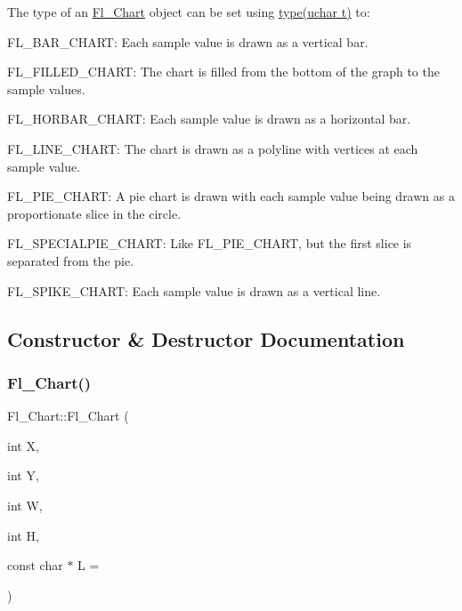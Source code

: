 The type of an \hyperlink{class_fl___chart}{Fl\+\_\+\+Chart} object can be set using \hyperlink{class_fl___widget_ad00d1457b3f578c8e6ffca52d9facad8}{type(uchar t)} to\+: \begin{DoxyItemize}
\item {\ttfamily F\+L\+\_\+\+B\+A\+R\+\_\+\+C\+H\+A\+RT\+:} Each sample value is drawn as a vertical bar. \item {\ttfamily F\+L\+\_\+\+F\+I\+L\+L\+E\+D\+\_\+\+C\+H\+A\+RT\+:} The chart is filled from the bottom of the graph to the sample values. \item {\ttfamily F\+L\+\_\+\+H\+O\+R\+B\+A\+R\+\_\+\+C\+H\+A\+RT\+:} Each sample value is drawn as a horizontal bar. \item {\ttfamily F\+L\+\_\+\+L\+I\+N\+E\+\_\+\+C\+H\+A\+RT\+:} The chart is drawn as a polyline with vertices at each sample value. \item {\ttfamily F\+L\+\_\+\+P\+I\+E\+\_\+\+C\+H\+A\+RT\+:} A pie chart is drawn with each sample value being drawn as a proportionate slice in the circle. \item {\ttfamily F\+L\+\_\+\+S\+P\+E\+C\+I\+A\+L\+P\+I\+E\+\_\+\+C\+H\+A\+RT\+:} Like {\ttfamily F\+L\+\_\+\+P\+I\+E\+\_\+\+C\+H\+A\+RT}, but the first slice is separated from the pie. \item {\ttfamily F\+L\+\_\+\+S\+P\+I\+K\+E\+\_\+\+C\+H\+A\+RT\+:} Each sample value is drawn as a vertical line. \end{DoxyItemize}


\subsection{Constructor \& Destructor Documentation}
\mbox{\label{class_fl___chart_ab8564a05a9e558ad5b5b562e86a77fb2}} 
\subsubsection{\texorpdfstring{Fl\+\_\+\+Chart()}{Fl\_Chart()}}
{\footnotesize\ttfamily Fl\+\_\+\+Chart\+::\+Fl\+\_\+\+Chart (\begin{DoxyParamCaption}\item[{int}]{X,  }\item[{int}]{Y,  }\item[{int}]{W,  }\item[{int}]{H,  }\item[{const char $\ast$}]{L = {} }\end{DoxyParamCaption})}

